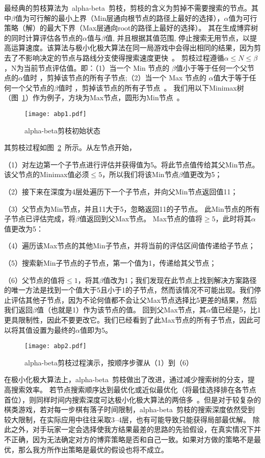 最经典的剪枝算法为~alpha-beta~剪枝，剪枝的含义为剪掉不需要搜索的节点。其中$\beta$值为可行解的最小上界（Min层通向根节点的路径上最好的选择），$\alpha$值为可行策略（解）的最大下界（Max层通向root的路径上最好的选择）。
其在生成博弈树的同时计算评估各节点的$\alpha$值与$\beta$值, 并且根据其值范围, 停止搜索无用节点，以提高运算速度。该算法与极小化极大算法在同一局游戏中会得出相同的结果，因为剪去了不影响决定的节点与路线分支使得搜索速度更快~\cite{russell2010artificial}。
剪枝过程遵循$\alpha \le N \le \beta$，N为当前节点评估值。即：（1）当一个 Min 节点的 $\beta$值小于等于任何一个父节点的$\alpha$值时 ，剪掉该节点的所有子节点;（2）当一个 Max 节点的 $\alpha$值大于等于任何一个父节点的$\beta$值时 ，剪掉该节点的所有子节点~\cite{russell2010artificial}。
我们用以下Minimax树（图~\ref{fig:abp}）作为例子，方块为Max节点，圆形为Min节点~\cite{russell2010artificial}。
\begin{figure}[htb]
    \centering
    \texttt{[image: abp1.pdf]}
    \caption[abp]{%
    alpha-beta剪枝初始状态~\cite{russell2010artificial}%
      }
    \label{fig:abp}
  \end{figure}

其剪枝过程如图~\ref{fig:abp2}~所示。从左节点开始，

（1）对左边第一个子节点进行评估并获得值为5。将此节点值传给其父Min节点。该父节点的Minimax值必须$\le 5$，所以我们将该Min节点$\beta$值更改为5；

（2）接下来在深度为4层处遍历下一个子节点，并向父Min节点返回值11；

（3）父节点为Min节点，并且11大于5，忽略返回11的子节点。 此Min节点的所有子节点已评估完成，将$\beta$值返回到父Max节点。 Max节点的值将$\ge 5$，此时将其$\alpha$值更改为5：

（4）遍历该Max节点的其他Min子节点，并将当前的评估区间值传递给子节点；

（5）搜索新Min子节点的子节点，第一个值为1，传递给其父节点；

（6）父节点的值将$\le 1$，将其$\beta$值改为1；我们发现在此节点上找到解决方案路径的唯一方法是找到一个值大于5且小于1的子节点，然而该情况不可能出现。我们停止评估其他子节点，因为不论何值都不会让父Max节点选择比5更差的结果，然后我们返回$\beta$值（也就是1）作为该节点的值。
回到父Max节点，其$\alpha$值已经是5，比1更具限制性，因此不要更改它。我们已经看到了此Max节点的所有子节点，因此可以将其值设置为最终的$\alpha$值即为5。

\begin{figure}[htb]
    \centering
    \texttt{[image: abp2.pdf]}
    \caption[abp2]{%
    alpha-beta剪枝过程演示，按顺序步骤从（1）到（6）~\cite{russell2010artificial}%
      }
    \label{fig:abp2}
  \end{figure}
\newpage
在极小化极大算法上，alpha-beta~剪枝做出了改进，通过减少搜索树的分支，提高搜索效率。
若节点搜索顺序达到最优化或近似最优化（将最佳选择排在各节点首位），则同样时间内搜索深度可达极小化极大算法的两倍多~\cite{KNUTH1975293abp}。但是对于较复杂的棋类游戏，若对每一步棋有落子时间限制，alpha-beta~剪枝的搜索深度依然受到较大限制，在实际应用中往往采取3--4层，也有可能导致只能获得局部最优解。
除此之外，对手玩家一定会选择使我方结果最差的思路的先验假设，在真实情况下并不正确，因为无法确定对方的博弈策略是否和自己一致。如果对方做的策略不是最优，那么我方所作出策略是最优的假设也将不成立。

